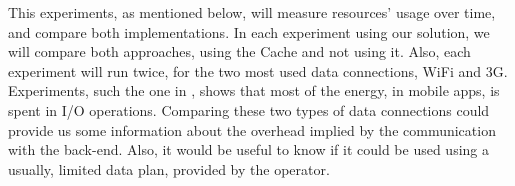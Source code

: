 This experiments, as mentioned below, 
will measure resources' usage over time, 
and compare both implementations. In each
experiment using our solution, we will
compare both approaches, using the Cache
and not using it. Also, each experiment
will run twice, for the two most used
data connections, WiFi and 3G.
Experiments, such the one
in \cite{Pathak2012}, shows that most of the energy, 
in mobile apps,
is spent in I/O operations.
Comparing these
two types of data connections could provide us
some information about the
overhead implied by the communication with
the back-end. Also, it would be useful to
know if it could be used using
a usually, limited data plan, provided by
the operator.

